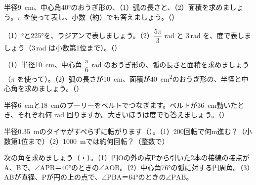 \bkendproblems
{}

\bkproblem 半径\qty{9}{cm}、中心角40°のおうぎ形の、（1）\nobreak 弧の長さと、（2）\nobreak 面積を求めましょう。$\pi$ を使って表し、小数（約）でも答えましょう。（）

\bkproblem （1）°と225°を、ラジアンで表しましょう。（2）\nobreak $\dfrac{5\pi}{3}$ rad と 3\,rad を、度で表しましょう（3\,rad は小数第1位まで）。（）

\bkproblem （1）\nobreak 半径\qty{10}{cm}、中心角 $\dfrac{\pi}{6}$ rad のおうぎ形の、弧の長さと面積を求めましょう（$\pi$ を使って）。（2）\nobreak 弧の長さが\qty{10}{cm}、面積が\qty{40}{cm^2}のおうぎ形の、半径と中心角を求めましょう。（）

\bkproblem 半径\qty{6}{cm}と\qty{18}{cm}のプーリーをベルトでつなぎます。ベルトが\qty{36}{cm}動いたとき、それぞれ何 rad 回りますか。大きいほうは度でも答えましょう。（）

\bkproblem 半径\qty{0.35}{m}のタイヤがすべらずに転がります（）。（1）\nobreak 200回転で何m進む？（小数第1位まで）（2）\nobreak \qty{1000}{m}では約何回転？（整数で）

\bkproblem 次の角を求めましょう（・）。（1）\nobreak 円Oの外の点Pから引いた2本の接線の接点がA、Bで、$\angle\mathrm{APB}$＝40°のときの$\angle\mathrm{AOB}$。（2）\nobreak 中心角76°の弧に対する円周角。（3）\nobreak ABが直径、Pが円の上の点で、$\angle\mathrm{PBA}$＝64°のときの$\angle\mathrm{PAB}$。

